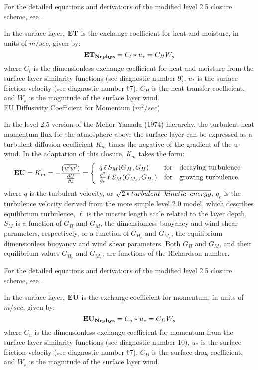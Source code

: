 \noindent
For the detailed equations and derivations of the modified level 2.5 closure scheme,
see \cite{helflab:88}.

\noindent
In the surface layer, ${\bf {ET}}$ is the exchange coefficient for heat and moisture,
in units of $m/sec$, given by:
\[
{\bf ET_{Nrphys}} =  C_t * u_* = C_H W_s
\]
\noindent
where $C_t$ is the dimensionless exchange coefficient for heat and moisture from the 
surface layer similarity functions (see diagnostic number 9), $u_*$ is the surface 
friction velocity (see diagnostic number 67), $C_H$ is the heat transfer coefficient,
and $W_s$ is the magnitude of the surface layer wind.
\\
 
\noindent
{ \underline {EU}  Diffusivity Coefficient for Momentum ($m^2/sec$) }
 
\noindent  
In the level 2.5 version of the Mellor-Yamada (1974) hierarchy, the turbulent heat
momentum flux for the atmosphere above the surface layer can be expressed as a turbulent
diffusion coefficient $K_m$ times the negative of the gradient of the u-wind.
In the \cite{helflab:88} adaptation of this closure, $K_m$
takes the form:
\[
{\bf EU} = K_m = -\frac{( \overline{u^{\prime}w^{\prime}} ) }{ \pp{U}{z} }
 = \left\{ \begin{array}{l@{\quad\mbox{for}\quad}l} q \, \ell \, S_M(G_M,G_H) & \mbox{decaying turbulence}
\\ \frac{ q^2 }{ q_e } \, \ell \, S_{M}(G_{M_e},G_{H_e}) & \mbox{growing turbulence} \end{array} \right.
\]
\noindent
where $q$ is the turbulent velocity, or $\sqrt{2*turbulent \hspace{.2cm} kinetic \hspace{.2cm}
energy}$, $q_e$ is the turbulence velocity derived from the more simple level 2.0 model,
which describes equilibrium turbulence, $\ell$ is the master length scale related to the layer
depth, 
$S_M$ is a function of $G_H$ and $G_M$, the dimensionless buoyancy and
wind shear parameters, respectively, or a function of $G_{H_e}$ and $G_{M_e}$, the equilibrium 
dimensionless buoyancy and wind shear
parameters.   Both $G_H$ and $G_M$, and their equilibrium values $G_{H_e}$ and $G_{M_e}$, 
are functions of the Richardson number.

\noindent
For the detailed equations and derivations of the modified level 2.5 closure scheme,
see \cite{helflab:88}.
 
\noindent
In the surface layer, ${\bf {EU}}$ is the exchange coefficient for momentum,
in units of $m/sec$, given by:
\[
{\bf EU_{Nrphys}} = C_u * u_* = C_D W_s
\]
\noindent
where $C_u$ is the dimensionless exchange coefficient for momentum from the surface layer 
similarity functions (see diagnostic number 10), $u_*$ is the surface friction velocity 
(see diagnostic number 67), $C_D$ is the surface drag coefficient, and $W_s$ is the 
magnitude of the surface layer wind.
\\
 
